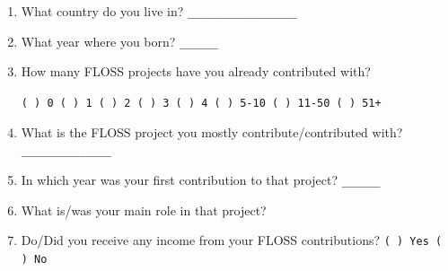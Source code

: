 \documentclass[lnbip]{svmultln}
\begin{document}
\begin{small}
  \begin{enumerate}
  \item What country do you live in? \verb=_________________=
    \vspace{8pt}

  \item What year where you born? \verb=______= \vspace{8pt}

  \item How many FLOSS projects have you already contributed with?

    \verb=( ) 0 ( ) 1 ( ) 2 ( ) 3 ( ) 4 ( ) 5-10 ( ) 11-50 ( ) 51+=
    \vspace{8pt}

  \item What is the FLOSS project you mostly contribute/contributed
    with? \verb= ______________= \vspace{0pt}

  \item In which year was your first contribution to that project?
    \verb=______= \vspace{8pt}

  \item What is/was your main role in that project?
    \vspace{8pt}

  \item Do/Did you receive any income from your FLOSS contributions?
    \verb=( ) Yes ( ) No= \vspace{0pt}


\end{enumerate}
\end{small}
\end{document}
